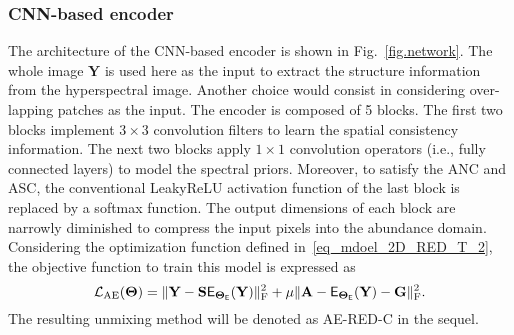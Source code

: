 \documentclass[journal,a4paper]{IEEEtran}
\newcommand{\bfY}{\mathbf{Y}}
\newcommand{\bTheta}{\boldsymbol{\Theta}}
\newcommand{\MATabund}{\mathbf{A}}
\newcommand{\MATend}{\mathbf{S}}
\begin{document}
\subsubsection{CNN-based encoder}
The architecture of the CNN-based encoder is shown in Fig.~\ref{fig.network}. The whole image $\mathbf{Y}$ is used here as the input to extract the structure information from the hyperspectral image. Another choice would consist in considering over-lapping patches as the input. The encoder is composed of 5 blocks. The first two blocks implement $3\times 3$ convolution filters to learn the spatial consistency information. The next two blocks apply $1\times 1$ convolution operators (i.e., fully connected layers) to model the spectral priors. Moreover, to satisfy the ANC and ASC, the conventional LeakyReLU activation function of the last block is replaced by a softmax function. The output dimensions of each block are narrowly diminished to compress the input pixels into the abundance domain. Considering the optimization function defined in~\eqref{eq_mdoel_2D_RED_T_2}, the objective function to train this model is expressed as
\begin{equation}\label{eq_loss}
  \mathcal{L}_{\text{AE}}(\boldsymbol{\Theta})=\|\mathbf{Y}-\MATend
  \mathsf{E}_{\bTheta_{\sf E}}(\bfY)\|_{\text{F}}^2 +\mu\|\MATabund-\mathsf{E}_{\bTheta_{\sf E}}(\bfY)-\mathbf{G}\|_{\text{F}}^{2}.
\end{equation}
The resulting unmixing method will be denoted as AE-RED-C in the sequel.
\end{document}
